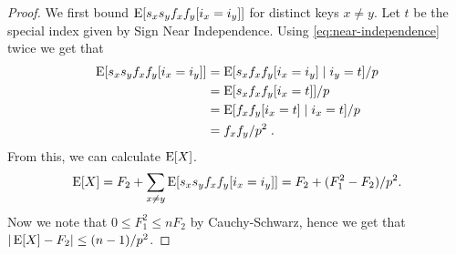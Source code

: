 \begin{proof}
    We first bound $\operatorname*{E}[s_x s_y f_x f_y [i_x = i_y]]$ for distinct keys
    $x \neq y$.
    Let $t$ be the special index given by Sign Near Independence.
    Using \cref{eq:near-independence} twice we get that
    \begin{equation}\begin{split}\label{eq:twice-split}
        \operatorname*{E}[s_x s_y f_x f_y [i_x = i_y]]
            &= \operatorname*{E}[s_x f_x f_y [i_x = i_y] \mid i_y = t]/p
            \\&= \operatorname*{E}[s_x f_x f_y [i_x = t]]/p
            \\&= \operatorname*{E}[f_x f_y [i_x = t] \mid i_x = t]/p
            \\&= f_x f_y / p^2 \; .
    \end{split}\end{equation}
    From this, we can calculate $\operatorname*{E}[X]$.
    \begin{align*}
        \operatorname*{E}[X]
            = F_2 + \sum_{x \neq y} \operatorname*{E}[s_x s_y f_x f_y [i_x = i_y]]
            = F_2 + (F_1^2 - F_2)/p^2 .
    \end{align*}
    Now we note that $0 \le F_1^2 \le n F_2$ by Cauchy-Schwarz, hence we get that
    $| \operatorname*{E}[X] - F_2 | \le (n - 1)/p^2$.


\end{proof}

